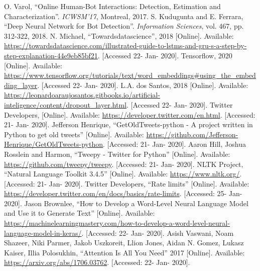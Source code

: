 \documentclass[hidelinks, conference]{IEEEtran}
\begin{document}
\begin{thebibliography}{00}
 O. Varol, ``Online Human-Bot Interactions: Detection, Estimation and Characterization''. \textit{ICWSM'17}, Montreal, 2017.
 S. Kudugunta and E. Ferrara, ``Deep Neural Network for Bot Detection''. \textit{Information Sciences}, vol. 467, pp. 312-322, 2018.
 N. Michael, ``Towardsdatascience'', 2018 [Online]. Available: \url{https://towardsdatascience.com/illustrated-guide-to-lstms-and-gru-s-a-step-by-step-explanation-44e9eb85bf21}. [Accessed 22- Jan- 2020].
 Tensorflow, 2020 [Online]. Available: \url{https://www.tensorflow.org/tutorials/text/word_embeddings#using_the_embedding_layer}. [Accessed 22- Jan- 2020].
 L.A. dos Santos, 2018 [Online]. Available: \url{https://leonardoaraujosantos.gitbooks.io/artificial-inteligence/content/dropout_layer.html}. [Accessed 22- Jan- 2020].
 Twitter Developers, [Online]. Available: \url{https://developer.twitter.com/en.html}. [Accessed: 21- Jan- 2020].
 Jefferson Henrique, ``GetOldTweets-python - A project written in Python to get old tweets'' [Online]. Available: \url{https://github.com/Jefferson-Henrique/GetOldTweets-python}. [Accessed: 21- Jan- 2020].
 Aaron Hill, Joshua Rosslein and Harmon, ``Tweepy - Twitter for Python'' [Online]. Available: \url{https://github.com/tweepy/tweepy}. [Accessed: 21- Jan- 2020].
 NLTK Project, ``Natural Language Toolkit 3.4.5'' [Online]. Available: \url{https://www.nltk.org/}. [Accessed: 21- Jan- 2020].
 Twitter Developers, ``Rate limits'' [Online]. Available: \url{https://developer.twitter.com/en/docs/basics/rate-limits}. [Accessed: 25- Jan- 2020].
 Jason Brownlee, ``How to Develop a Word-Level Neural Language Model and Use it to Generate Text'' [Online]. Available: \url{https://machinelearningmastery.com/how-to-develop-a-word-level-neural-language-model-in-keras/}. [Accessed: 22- Jan- 2020].
 Asish Vaswani, Noam Shazeer, Niki Parmer, Jakob Uszkoreit, Llion Jones, Aidan N. Gomez, Lukasz Kaiser, Illia Polosukhin, ``Attention Is All You Need'' 2017 [Online]. Available: \url{https://arxiv.org/abs/1706.03762}. [Accessed: 22- Jan- 2020].
\end{thebibliography}
\end{document}
